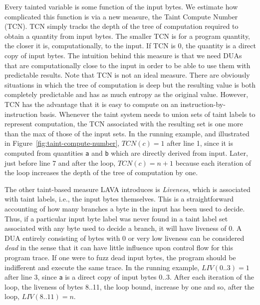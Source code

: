 Every tainted variable is some function of the input bytes.
We estimate how complicated this function is via a new measure, the Taint Compute Number (TCN).
TCN simply tracks the depth of the tree of computation required to obtain a quantity from input bytes.
The smaller TCN is for a program quantity, the closer it is, computationally, to the input.
If TCN is 0, the quantity is a direct copy of input bytes.
The intuition behind this measure is that we need DUAs that are computationally close to the input in order to be able to use them with predictable results.
Note that TCN is not an ideal measure.
There are obviously situations in which the tree of computation is deep but the resulting value is both completely predictable and has as much entropy as the original value.
However, TCN has the advantage that it is easy to compute on an instruction-by-instruction basis.
Whenever the taint system needs to union sets of taint labels to represent computation, the TCN associated with the resulting set is one more than the max of those of the 
input sets.
In the running example, and illustrated in Figure~\ref{fig:taint-compute-number}, $TCN(c)=1$ after line 1, since it is computed from quantities \verb+a+ and \verb+b+ which are directly derived from input.
Later, just before line 7 and after the loop, $TCN(c)=n+1$ because each iteration of the loop increases the depth of the tree of computation by one.  

The other taint-based measure LAVA introduces is \emph{Liveness}, which is associated with taint labels, i.e., the input bytes themselves.
This is a straightforward accounting of how many branches a byte in the input has been used to decide.
Thus, if a particular input byte label was never found in a taint label set associated with any byte used to decide a branch, it will have liveness of 0.
A DUA entirely consisting of bytes with 0 or very low liveness can be considered \emph{dead} in the sense that it can have little influence upon control flow for this program trace.
If one were to fuzz dead input bytes, the program should be indifferent and execute the same trace.  
In the running example, $LIV(0..3)=1$ after line 3, since \verb+a+ is a direct copy of input bytes 0..3.
After each iteration of the loop, the liveness of bytes 8..11, the loop bound, increase by one and so, after the loop, $LIV(8..11)=n$.

